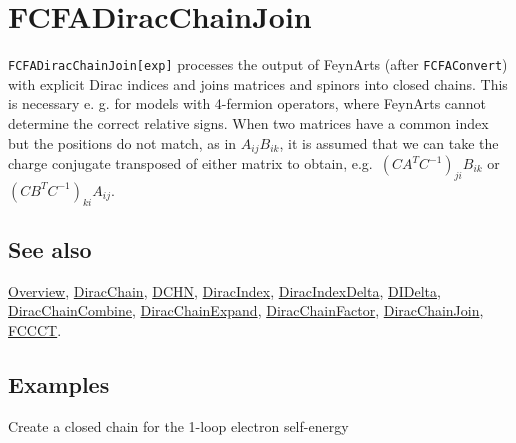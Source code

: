 \documentclass[../FeynCalcManual.tex]{subfiles}
\begin{document}
\hypertarget{fcfadiracchainjoin}{
\section{FCFADiracChainJoin}\label{fcfadiracchainjoin}}

\texttt{FCFADiracChainJoin[\allowbreak{}exp]} processes the output of
FeynArts (after \texttt{FCFAConvert}) with explicit Dirac indices and
joins matrices and spinors into closed chains. This is necessary e. g.
for models with 4-fermion operators, where FeynArts cannot determine the
correct relative signs. When two matrices have a common index but the
positions do not match, as in \(A_{ij} B_{ik}\), it is assumed that we
can take the charge conjugate transposed of either matrix to obtain,
e.g.~\(\left(C A^T C^{-1}\right)_{ji} B_{ik}\) or
\(\left(C B^TC^{-1}\right)_{ki} A_{ij}\).

\subsection{See also}

\hyperlink{toc}{Overview}, \hyperlink{diracchain}{DiracChain},
\hyperlink{dchn}{DCHN}, \hyperlink{diracindex}{DiracIndex},
\hyperlink{diracindexdelta}{DiracIndexDelta},
\hyperlink{didelta}{DIDelta},
\hyperlink{diracchaincombine}{DiracChainCombine},
\hyperlink{diracchainexpand}{DiracChainExpand},
\hyperlink{diracchainfactor}{DiracChainFactor},
\hyperlink{diracchainjoin}{DiracChainJoin}, \hyperlink{fccct}{FCCCT}.

\subsection{Examples}

Create a closed chain for the 1-loop electron self-energy
\end{document}
